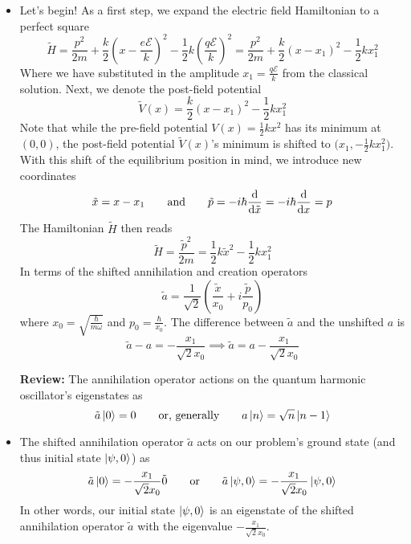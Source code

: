\documentclass[11pt, a4paper]{article}
\newcommand{\eqtext}[1]{\qquad \text{#1} \qquad}
\begin{document}
\begin{itemize}
	\item Let's begin! As a first step, we expand the electric field Hamiltonian to a perfect square
	\begin{equation*}
		\tilde{H} = \frac{p^{2}}{2m} + \frac{k}{2}\left(x - \frac{e\mathcal{E}}{k}\right)^{2} - \frac{1}{2}k\left(\frac{q\mathcal{E}}{k}\right)^{2} = \frac{p^{2}}{2m} + \frac{k}{2}\left(x - x_{1}\right)^{2} - \frac{1}{2}kx_{1}^{2}
	\end{equation*}
	Where we have substituted in the amplitude $ x_{1} = \frac{q\mathcal{E}}{k} $ from the classical solution. Next, we denote the post-field potential
	\begin{equation*}
		\tilde{V}(x) = \frac{k}{2}\left(x - x_{1}\right)^{2} - \frac{1}{2}kx_{1}^{2}
	\end{equation*}
	Note that while the pre-field potential $ V(x) = \frac{1}{2}kx^{2} $ has its minimum at $ (0, 0) $, the post-field potential $ \tilde{V}(x) $'s minimum is shifted to $ \big(x_{1}, - \frac{1}{2}kx_{1}^{2}\big) $. With this shift of the equilibrium position in mind, we introduce new coordinates
	\begin{equation*}
		\tilde{x} = x - x_{1} \eqtext{and} \tilde{p} = - i\hbar
 		\dv{\tilde{x}} = -i \hbar \dv{x} = p
 	\end{equation*}
 	The Hamiltonian $ \tilde{H} $ then reads
 	\begin{equation*}
 		\tilde{H} = \frac{\tilde{p}^{2}}{2m} = \frac{1}{2}k\tilde{x}^{2} - \frac{1}{2}kx_{1}^{2}
 	\end{equation*}
 	In terms of the shifted annihilation and creation operators
 	\begin{equation*}
 		\tilde{a} = \frac{1}{\sqrt{2}}\left(\frac{\tilde{x}}{x_{0}} + i\frac{\tilde{p}}{p_{0}}\right) 
 	\end{equation*}
 	where $ x_{0} = \sqrt{\frac{\hbar}{m\omega}}$ and $ p_{0} = \frac{\hbar}{x_{0}} $. The difference between $ \tilde{a} $  and the unshifted $ a $ is
 	\begin{equation*}
 		\tilde{a} - a = -\frac{x_{1}}{\sqrt{2}x_{0}} \implies \tilde{a} = a -\frac{x_{1}}{\sqrt{2}x_{0}}
 	\end{equation*}
 	
 	\textbf{Review:} The annihilation operator actions on the quantum harmonic oscillator's eigenstates as
 	\begin{equation*}
 		\tilde{a}\ket{0} = 0 \eqtext{or, generally} a \ket{n} = \sqrt{n} \ket{n-1}
 	\end{equation*}
 	
 	\item The shifted annihilation operator $ \tilde{a} $ acts on our problem's ground state (and thus initial state $ \ket{\psi, 0} $) as
 	\begin{equation*}
 		\tilde{a}\ket{0} = - \frac{x_{1}}{\sqrt{2}x_{0}} \tilde{0} \eqtext{or} \tilde{a}\ket{\psi, 0} = - \frac{x_{1}}{\sqrt{2}x_{0}} \ket{\psi, 0}
 	\end{equation*}
 	In other words, our initial state $ \ket{\psi, 0} $ is an eigenstate of the shifted annihilation operator $ \tilde{a} $ with the eigenvalue $  - \frac{x_{1}}{\sqrt{2}x_{0}} $. 

	
\end{itemize}
\end{document}
